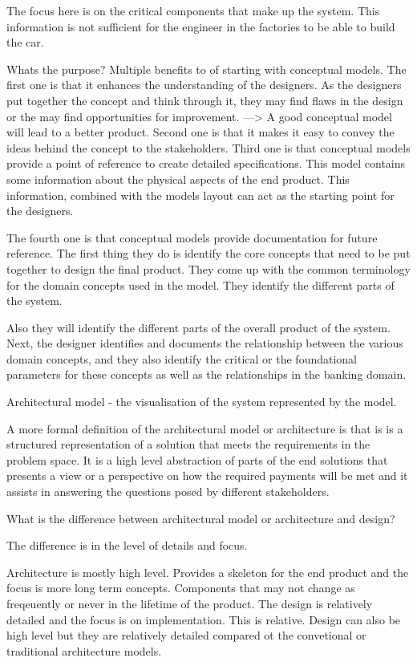 \documentclass[a4paper, 11pt]{book}
\begin{document}
    The focus here is on the critical components that make up the system.
    This information is not sufficient for the engineer in the factories to be able to build the car.

    Whats the purpose?
    Multiple benefits to of starting with conceptual models.
    The first one is that it enhances the understanding of the designers.
    As the designers put together the concept and think through it, they may find flaws in the design or the may find opportunities for improvement.
    ---> A good conceptual model will lead to a better product.
    Second one is that it makes it easy to convey the ideas behind the concept to the stakeholders.
    Third one is that conceptual models provide a point of reference to create detailed specifications.
    This model contains some information about the physical aspects of the end product.
    This information, combined with the models layout can act as the starting point for the designers.

    The fourth one is that conceptual models provide documentation for future reference.
    The first thing they do is identify the core concepts that need to be put together to design the final product.
    They come up with the common terminology for the domain concepts used in the model.
    They identify the different parts of the system.

    Also they will identify the different parts of the overall product of the system.
    Next, the designer identifies and documents the relationship between the various domain concepts, and they also identify the critical or the foundational parameters for these concepts as well as the relationships in the banking domain.

    Architectural model - the visualisation of the system represented by the model.

    A more formal definition of the architectural model or architecture is that is is a structured representation of a solution that meets the requirements in the problem space.
    It is a high level abstraction of parts of the end solutions that presents a view or a perspective on how the required payments will be met and it assists in answering the questions posed by different stakeholders.

    What is the difference between architectural model or architecture and design?

    The difference is in the level of details and focus.

    Architecture is mostly high level.
    Provides a skeleton for the end product and the focus is more long term concepts. Components that may not change as freqeuently or never in the lifetime of the product.
    The design is relatively detailed and the focus is on implementation.
    This is relative. Design can also be high level but they are relatively detailed compared ot the convetional or traditional architecture models.
\end{document}
